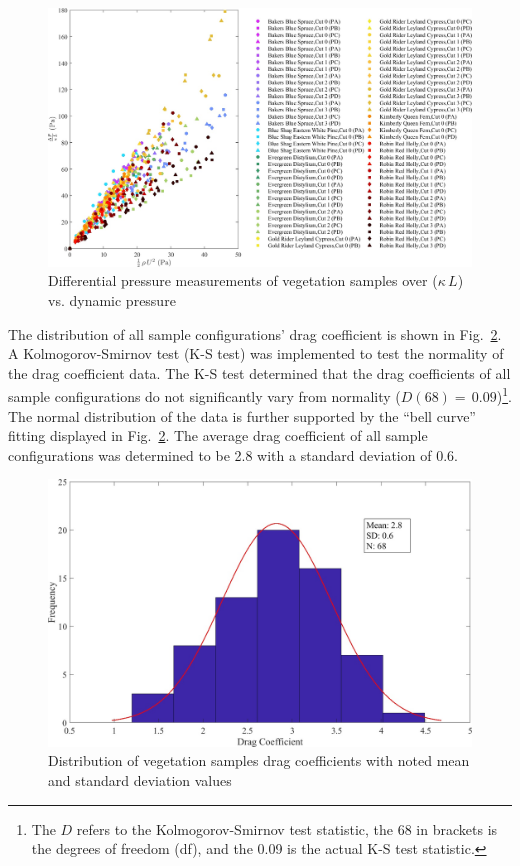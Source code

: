 \documentclass[12pt]{article}
\begin{document}
\begin{figure}
	\centering
	\includegraphics[width=\textwidth,keepaspectratio]{Picture9.jpg}
	\caption{Differential pressure measurements of vegetation samples over ($\kappa \, L$) vs. dynamic pressure}
	\label{fig:DPoveraf(Overall)}
\end{figure}

The distribution of all sample configurations' drag coefficient is shown in Fig.~\ref{fig:Histogram}. A Kolmogorov-Smirnov test (K-S test) was implemented to test the normality of the drag coefficient data. The K-S test determined that the drag coefficients of all sample configurations do not significantly vary from normality ($D(68)=\,0.09$)\footnote{The $D$ refers to the Kolmogorov-Smirnov test statistic, the 68 in brackets is the degrees of freedom (df), and the 0.09 is the actual K-S test statistic.}. The normal distribution of the data is further supported by the ``bell curve'' fitting displayed in  Fig.~\ref{fig:Histogram}. The average drag coefficient of all sample configurations was determined to be 2.8 with a standard deviation of 0.6.

\begin{figure}[!h]
\includegraphics[width=\textwidth,keepaspectratio]{Picture11.jpg}
	\caption[Distribution of drag coefficients]{Distribution of vegetation samples drag coefficients with noted mean and standard deviation values}
	\label{fig:Histogram}
\end{figure}
\end{document}
